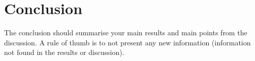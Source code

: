 \section{Conclusion}


The conclusion should summarise your main results and main points from the discussion.
A rule of thumb is to not present any new information (information not found in the results or discussion).